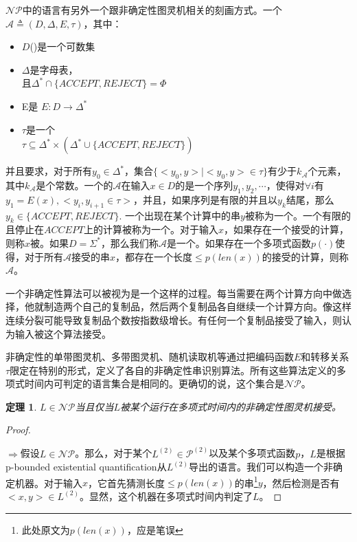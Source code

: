 \documentclass[twocolumn]{article}
\newtheorem{theorem}{\hspace{2em}定理}
\theoremstyle{nonumberplain}%
\newtheorem{proof}{\hspace{2em}证明}
\begin{document}
\begin{CJK}{UTF8}{gbsn}
    $\mathcal{NP}$中的语言有另外一个跟非确定性图灵机相关的刻画方式。一个{}$\mathcal{A}\triangleq(D,\Delta,E,\tau)$，其中：
    \begin{itemize}
    \item $D$({})是一个可数集
    \item $\Delta$是字母表， \\
        且$\Delta^*\cap \{ACCEPT,REJECT\}=\Phi$
    \item E是{} $E:D\rightarrow\Delta^*$
    \item $\tau$是一个{} \\
        $\tau\subseteq\Delta^*\times(\Delta^*\cup \{ACCEPT,REJECT\})$
    \end{itemize}
    并且要求，对于所有$y_0 \in \Delta^*$，集合$\{<y_0,y>|<y_0,y>\in \tau\}$有少于$k_\mathcal{A}$个元素，其中$k_\mathcal{A}$是个常数。一个的$\mathcal{A}$在输入$x\in D$的{}是一个序列$y_1,y_2,\cdots$，使得对$\forall i$有$y_1=E(x),<y_i,y_{i+1}\in\tau>$，并且，如果序列是有限的并且以$y_k$结尾，那么$y_k \in \{ACCEPT,REJECT\}$. 一个出现在某个计算中的串$y$被称为一个{}。一个有限的且停止在$ACCEPT$上的计算被称为一个{}。对于输入$x$，如果存在一个接受的计算，则称$x$被{}。如果$D=\Sigma^*$，那么我们称$\mathcal{A}$是一个{}。如果存在一个多项式函数$p(\cdot)$使得，对于所有$\mathcal{A}$接受的串$x$，都存在一个长度$\leq p(len(x))$的接受的计算，则称$\mathcal{A}${}。

    一个非确定性算法可以被视为是一个这样的过程。每当需要在两个计算方向中做选择，他就制造两个自己的复制品，然后两个复制品各自继续一个计算方向。像这样连续分裂可能导致复制品个数按指数级增长。有任何一个复制品接受了输入，则认为输入被这个算法接受。

    非确定性的单带图灵机、多带图灵机、随机读取机等通过把编码函数$E$和转移关系$\tau$限定在特别的形式，定义了各自的非确定性串识别算法。所有这些算法定义的多项式时间内可判定的语言集合是相同的。更确切的说，这个集合是$\mathcal{NP}$。

    \begin{theorem}
      $L\in \mathcal{NP}$当且仅当$L$被某个运行在多项式时间内的非确定性图灵机接受。
    \end{theorem}

    \begin{proof}
        　

        $\Rightarrow$假设$L\in\mathcal{NP}$。那么，对于某个$L^{(2)}\in\mathcal{P}^{(2)}$以及某个多项式函数$p$，$L$是根据p-bounded existential quantification从$L^{(2)}$导出的语言。我们可以构造一个非确定机器。对于输入$x$，它首先猜测长度$\leq p(len(x))$的串\footnote{此处原文为$p(len(x))$，应是笔误}$y$，然后检测是否有$<x,y>\in L^{(2)}$。显然，这个机器在多项式时间内判定了$L$。


\end{proof}
\end{CJK}
\end{document}
